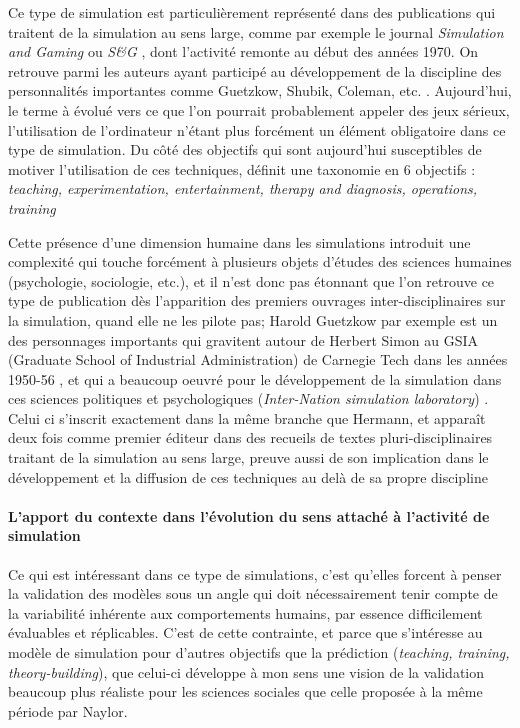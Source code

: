 Ce type de simulation est particulièrement représenté dans des publications qui traitent de la simulation au sens large, comme par exemple le journal \textit{Simulation and Gaming} ou \textit{S\&G} \autocite{Crookall2011}, dont l'activité remonte au début des années 1970. On retrouve parmi les auteurs ayant participé au développement de la discipline des personnalités importantes comme Guetzkow, Shubik, Coleman, etc. \autocite{Crookall2012}. Aujourd'hui, le terme à évolué vers ce que l'on pourrait probablement appeler des jeux sérieux, l'utilisation de l'ordinateur n'étant plus forcément un élément obligatoire dans ce type de simulation. Du côté des objectifs qui sont aujourd'hui susceptibles de motiver l'utilisation de ces techniques, \textcite{Shubik2009} définit une taxonomie en 6 objectifs : \textit{teaching, experimentation, entertainment, therapy and diagnosis, operations, training }

Cette présence d'une dimension humaine dans les simulations introduit une complexité qui touche forcément à plusieurs objets d'études des sciences humaines (psychologie, sociologie, etc.), et il n'est donc pas étonnant que l'on retrouve ce type de publication dès l'apparition des premiers ouvrages inter-disciplinaires sur la simulation, quand elle ne les pilote pas; Harold Guetzkow par exemple est un des personnages importants qui gravitent autour de Herbert Simon au GSIA (Graduate School of Industrial Administration) de Carnegie Tech dans les années 1950-56 \autocite{Guetzkow2004}, et qui a beaucoup oeuvré pour le développement de la simulation dans ces sciences politiques et psychologiques (\textit{Inter-Nation simulation laboratory}) \autocite{Janda2011, Druckman2010}. Celui ci s'inscrit exactement dans la même branche que Hermann, et apparaît deux fois comme premier éditeur dans des recueils de textes pluri-disciplinaires traitant de la simulation au sens large, preuve aussi de son implication dans le développement et la diffusion de ces techniques au delà de sa propre discipline \autocite{Guetzkow1962, Guetzkow1972}

\paragraph{L'apport du contexte dans l'évolution du sens attaché à l'activité de simulation}

Ce qui est intéressant dans ce type de simulations, c'est qu'elles forcent à penser la validation des modèles sous un angle qui doit nécessairement tenir compte de la variabilité inhérente aux comportements humains, par essence difficilement évaluables et réplicables. C'est de cette contrainte, et parce que \textcite{Hermann1967} s'intéresse au modèle de simulation pour d'autres objectifs que la prédiction (\textit{teaching, training, theory-building}), que celui-ci développe à mon sens une vision de la validation beaucoup plus réaliste pour les sciences sociales que celle proposée à la même période par Naylor.

